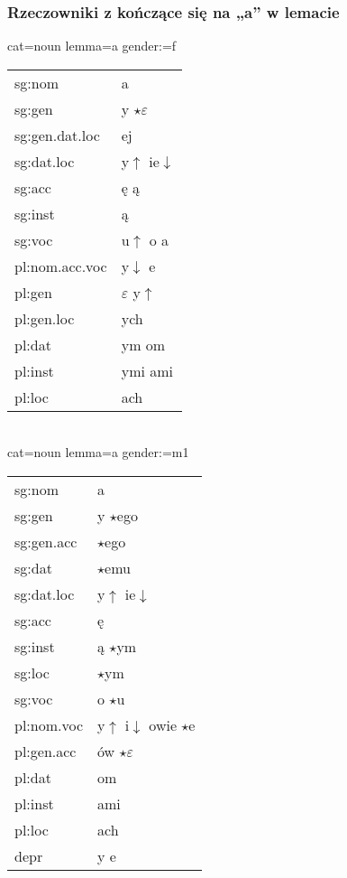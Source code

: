 \documentclass{beamer}
\begin{document}
\begin{frame}
\frametitle{Rzeczowniki z kończące się na „a” w lemacie}
\vspace{-3mm}
\begin{scriptsize}
\begin{multicols}{2}
cat=noun lemma=a gender:=f\\
\begin{tabular}{l|l}
sg:nom & a\\
sg:gen & y $\star\varepsilon$\\
sg:gen.dat.loc & ej\\
sg:dat.loc & y$\uparrow$ ie$\downarrow$\\
sg:acc & ę ą\\
sg:inst & ą\\
sg:voc & u$\uparrow$ o a\\
pl:nom.acc.voc & y$\downarrow$ e\\
pl:gen & $\varepsilon$ y$\uparrow$\\
pl:gen.loc & ych\\
pl:dat & ym om\\
pl:inst & ymi ami\\
pl:loc & ach\\
\end{tabular}\\
\vfill\null
\columnbreak
cat=noun lemma=a gender:=m1\\
\begin{tabular}{l|l}
sg:nom & a\\
sg:gen & y $\star$ego\\
sg:gen.acc & $\star$ego\\
sg:dat & $\star$emu\\
sg:dat.loc & y$\uparrow$ ie$\downarrow$\\
sg:acc & ę\\
sg:inst & ą $\star$ym\\
sg:loc & $\star$ym\\
sg:voc & o $\star$u\\
pl:nom.voc & y$\uparrow$ i$\downarrow$ owie $\star$e\\
pl:gen.acc & ów $\star\varepsilon$\\
pl:dat & om\\
pl:inst & ami\\
pl:loc & ach\\
depr & y e\\
\end{tabular}
\end{multicols}\end{scriptsize}
\end{frame}
\end{document}
